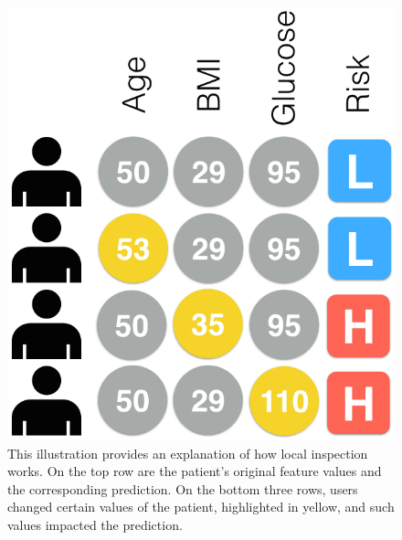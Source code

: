
\begin{figure}[b!]
\centering
\includegraphics[width=0.3\linewidth]{prospector/local-inspection-explanation} %
\caption{
This illustration provides an explanation of how local inspection works.  On the top row are the patient's original feature values and the corresponding prediction.  On the bottom three rows, users changed certain values of the patient, highlighted in yellow, and such values impacted the prediction.
}
\label{figs:liexplain}
\end{figure}